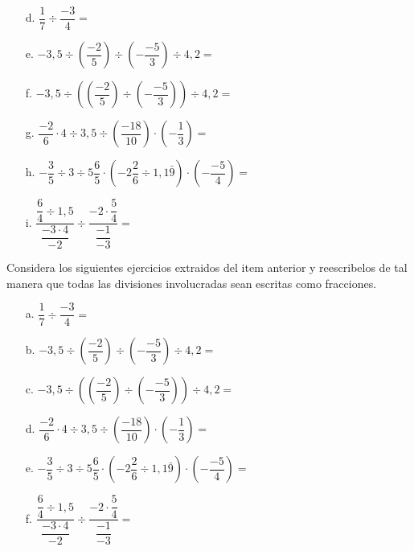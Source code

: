 \documentclass[spanish,letterpaper, 11pt, addpoints, answers]{exam}
\begin{document}
\begin{questions}
\begin{multicols}{2}
\begin{itemize}
\item[d.] $\dfrac{1}{7}\div \dfrac{-3}{4}=$

\item[e.] $-3{,}5\div \left(\dfrac{-2}{5}\right)\div \left(-\dfrac{-5}{3}\right)\div 4{,}2=$

\item[f.] $-3{,}5\div \left(\left(\dfrac{-2}{5}\right)\div \left(-\dfrac{-5}{3}\right)\right)\div 4{,}2=$

\item[g.] $\dfrac{-2}{6}\cdot 4\div 3{,}5\div \left(\dfrac{-18}{10}\right)\cdot \left(-\dfrac{1}{3}\right)=$

\item[h.] $-\dfrac{3}{5}\div 3\div 5\dfrac{6}{5}\cdot \left(-2\dfrac{2}{6}\div1{,}1\bar{9}\right)\cdot \left(-\dfrac{-5}{4}\right)=$

\item[i.] $\dfrac{\dfrac{6}{4}\div 1{,}5}{\dfrac{-3\cdot 4}{-2}}\div\dfrac{-2\cdot \dfrac{5}{4}}{\dfrac{-1}{-3}}=$

\end{itemize}

\end{multicols}
\question Considera los siguientes ejercicios extraidos del item anterior y reescribelos de tal manera que todas las divisiones involucradas sean escritas como fracciones.

\begin{itemize}
  \item[a.] $\dfrac{1}{7}\div \dfrac{-3}{4}=$

  \item[b.] $-3{,}5\div \left(\dfrac{-2}{5}\right)\div \left(-\dfrac{-5}{3}\right)\div 4{,}2=$

  \item[c.] $-3{,}5\div \left(\left(\dfrac{-2}{5}\right)\div \left(-\dfrac{-5}{3}\right)\right)\div 4{,}2=$

  \item[d.] $\dfrac{-2}{6}\cdot 4\div 3{,}5\div \left(\dfrac{-18}{10}\right)\cdot \left(-\dfrac{1}{3}\right)=$

  \item[e.] $-\dfrac{3}{5}\div 3\div 5\dfrac{6}{5}\cdot \left(-2\dfrac{2}{6}\div1{,}1\bar{9}\right)\cdot \left(-\dfrac{-5}{4}\right)=$

  \item[f.] $\dfrac{\dfrac{6}{4}\div 1{,}5}{\dfrac{-3\cdot 4}{-2}}\div\dfrac{-2\cdot \dfrac{5}{4}}{\dfrac{-1}{-3}}=$


\end{itemize}
\end{questions}
\end{document}
